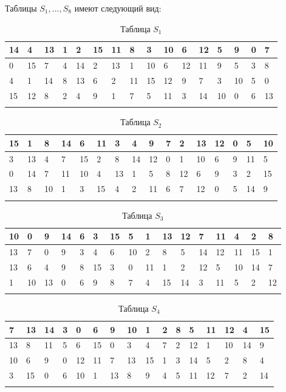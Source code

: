 \documentclass{./civarticle}
\begin{document}
\begin{itemize}
\begin{enumerate}
Таблицы $S_1, ..., S_8$ имеют следующий вид:

\begin{longtable}{|p{0.5cm}|p{0.5cm}|p{0.5cm}|p{0.5cm}|p{0.5cm}|p{0.5cm}|p{0.5cm}|p{0.5cm}|p{0.5cm}|p{0.5cm}|p{0.5cm}|p{0.5cm}|p{0.5cm}|p{0.5cm}|p{0.5cm}|p{0.5cm}|}
\hline
14 & 4 & 13 & 1 & 2 & 15 & 11 & 8 & 3 & 10 & 6 & 12 & 5 & 9 & 0 & 7 \\
\hline
0 & 15 & 7 & 4 & 14 & 2 & 13 & 1 & 10 & 6 & 12 & 11 & 9 & 5 & 3 & 8 \\
\hline
4 & 1 & 14 & 8 & 13 & 6 & 2 & 11 & 15 & 12 & 9 & 7 & 3 & 10 & 5 & 0 \\
\hline
15 & 12 & 8 & 2 & 4 & 9 & 1 & 7 & 5 & 11 & 3 & 14 & 10 & 0 & 6 & 13 \\
\hline
\caption{Таблица $S_1$}
\end{longtable}

\begin{longtable}{|p{0.5cm}|p{0.5cm}|p{0.5cm}|p{0.5cm}|p{0.5cm}|p{0.5cm}|p{0.5cm}|p{0.5cm}|p{0.5cm}|p{0.5cm}|p{0.5cm}|p{0.5cm}|p{0.5cm}|p{0.5cm}|p{0.5cm}|p{0.5cm}|}
\hline
15 & 1 & 8 & 14 & 6 & 11 & 3 & 4 & 9 & 7 & 2 & 13 & 12 & 0 & 5 & 10 \\
\hline
3 & 13 & 4 & 7 & 15 & 2 & 8 & 14 & 12 & 0 & 1 & 10 & 6 & 9 & 11 & 5 \\
\hline
0 & 14 & 7 & 11 & 10 & 4 & 13 & 1 & 5 & 8 & 12 & 6 & 9 & 3 & 2 & 15 \\
\hline
13 & 8 & 10 & 1 & 3 & 15 & 4 & 2 & 11 & 6 & 7 & 12 & 0 & 5 & 14 & 9 \\
\hline
\caption{Таблица $S_2$}
\end{longtable}

\begin{longtable}{|p{0.5cm}|p{0.5cm}|p{0.5cm}|p{0.5cm}|p{0.5cm}|p{0.5cm}|p{0.5cm}|p{0.5cm}|p{0.5cm}|p{0.5cm}|p{0.5cm}|p{0.5cm}|p{0.5cm}|p{0.5cm}|p{0.5cm}|p{0.5cm}|}
\hline
10 & 0 & 9 & 14 & 6 & 3 & 15 & 5 & 1 & 13 & 12 & 7 & 11 & 4 & 2 & 8 \\
\hline
13 & 7 & 0 & 9 & 3 & 4 & 6 & 10 & 2 & 8 & 5 & 14 & 12 & 11 & 15 & 1 \\
\hline
13 & 6 & 4 & 9 & 8 & 15 & 3 & 0 & 11 & 1 & 2 & 12 & 5 & 10 & 14 & 7 \\
\hline
1 & 10 & 13 & 0 & 6 & 9 & 8 & 7 & 4 & 15 & 14 & 3 & 11 & 5 & 2 & 12 \\
\hline
\caption{Таблица $S_3$}
\end{longtable}

\begin{longtable}{|p{0.5cm}|p{0.5cm}|p{0.5cm}|p{0.5cm}|p{0.5cm}|p{0.5cm}|p{0.5cm}|p{0.5cm}|p{0.5cm}|p{0.5cm}|p{0.5cm}|p{0.5cm}|p{0.5cm}|p{0.5cm}|p{0.5cm}|p{0.5cm}|}
\hline
7 & 13 & 14 & 3 & 0 & 6 & 9 & 10 & 1 & 2 & 8 & 5 & 11 & 12 & 4 & 15 \\
\hline
13 & 8 & 11 & 5 & 6 & 15 & 0 & 3 & 4 & 7 & 2 & 12 & 1 & 10 & 14 & 9 \\
\hline
10 & 6 & 9 & 0 & 12 & 11 & 7 & 13 & 15 & 1 & 3 & 14 & 5 & 2 & 8 & 4 \\
\hline
3 & 15 & 0 & 6 & 10 & 1 & 13 & 8 & 9 & 4 & 5 & 11 & 12 & 7 & 2 & 14 \\
\hline
\caption{Таблица $S_4$}
\end{longtable}


\end{enumerate}
\end{itemize}
\end{document}
